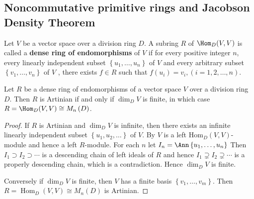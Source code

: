\subsection{Noncommutative primitive rings and Jacobson Density Theorem} %
\begin{definition}
    Let $V$ be a vector space over a division ring $D$.
    A subring $R$ of $\Hom_{D}(V, V)$ is called a \textbf{dense ring of endomorphisms} of $V$ if for every positive integer $n$, every linearly independent subset $\left\{u_1, \ldots, u_{n}\right\}$ of $V$ and every arbitrary subset $\left\{v_1, \ldots, v_{n}\right\}$ of $V$ , there exists $f \in R$ such that $f\left(u_{i}\right)=v_{i}, (i=1,2, \ldots, n)$.
\end{definition}


\begin{theorem}
    \label{thm: Dense ring of endomorphisms of a finite dimensional vector space}
    Let $R$ be a dense ring of endomorphisms of a vector space $V$ over a division ring $D$.
    Then $R$ is Artinian if and only if $\operatorname{dim}_{D} V$ is finite, in which case $R=\Hom_{D}(V, V)\cong M_n\left(D\right)$.

    \begin{proof}
        If $R$ is Artinian and $\operatorname{dim}_D V$ is infinite, then there exists an infinite linearly independent subset $\left\{u_1, u_2, \ldots\right\}$ of $V$. By  $V$ is a left $\mathrm{Hom}_D(V, V)$-module and hence a left $R$-module. For each $n$ let $I_n=\Ann\left\{u_1, \ldots, u_n\right\}$
        Then $I_1 \supset I_2 \supset \cdots$ is a descending chain of left ideals of $R$ and hence $I_1\supsetneq I_2\supsetneq\cdots$ is a properly descending chain, which is a contradiction. Hence $\dim_D V$ is finite.

        Conversely if $\operatorname{dim}_D V$ is finite, then $V$ has a finite basis $\left\{v_1, \ldots, v_m\right\}$. Then $R= \operatorname{Hom}_D(V, V)\cong M_n\left(D\right) $ is Artinian.
    \end{proof}
\end{theorem}


